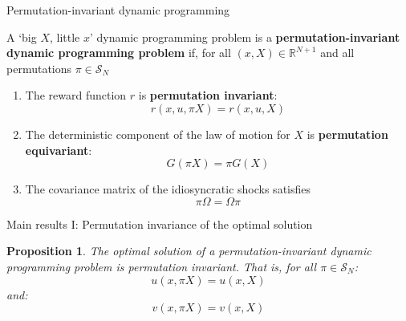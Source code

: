 \documentclass[aspectratio=169,10pt]{beamer}
\newcommand{\emphcolor}[1]{\textbf{\textcolor{emphcolorval}{#1}}}
\newtheorem{proposition}{Proposition}
\begin{document}
\begin{frame}{Permutation-invariant dynamic programming}
\begin{definition}
	A `big $X$, little $x$' dynamic programming problem is a \emphcolor{permutation-invariant dynamic programming problem} if, for all $(x,X)\in \mathbb{R}^{N+1}$ and all permutations $\pi \in \mathcal{S}_N$
	\begin{enumerate}
		\item The reward function $r$ is \emphcolor{permutation invariant}:
		\begin{equation*}
			r(x,u,\pi X) = r(x,u,X)
		\end{equation*}
		\item The deterministic component of the law of motion for $X$ is \emphcolor{permutation equivariant}:
		\begin{equation*}
			G(\pi X) = \pi G(X)\end{equation*}
		\item The covariance matrix of the idiosyncratic shocks satisfies
		\begin{equation*}
			\pi \Omega = \Omega\pi
		\end{equation*}
	\end{enumerate}
\end{definition}	
\end{frame}


\begin{frame}{Main results I: Permutation invariance of the optimal solution}
	
	\begin{proposition}
		The optimal solution of a permutation-invariant dynamic programming problem is permutation invariant. That is, for all $\pi \in \mathcal{S}_N$:
		\begin{equation*}
			u(x,\pi X) = u(x,X)
		\end{equation*}
		and:
		\begin{equation*}
			v(x,\pi X) = v(x,X)
		\end{equation*}
		\vspace{-0.25in}
	\end{proposition}
\end{frame}
		
		
	
		

		
		
\end{document}
